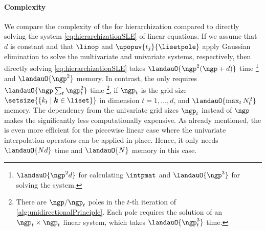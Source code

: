 \paragraph{Complexity}

We compare the complexity of the \up for hierarchization compared
to directly solving the system \eqref{eq:hierarchizationSLE} of
linear equations.
If we assume that $d$ is constant and that
$\linop$ and $\upopuv{t_j}{\lisetpole}$ apply Gaussian elimination to
solve the multivariate and univariate systems, respectively,
then directly solving \eqref{eq:hierarchizationSLE} takes
$\landauO{\ngp^2 (\ngp + d)}$ time%
\footnote{%
  $\landauO{\ngp^2 d}$ for calculating $\intpmat$ and
  $\landauO{\ngp^3}$ for solving the system.
}
and
$\landauO{\ngp^2}$ memory.
In contrast, the \up only requires
$\landauO{\ngp \sum_t \ngp_t^2}$ time%
\footnote{%
  There are $\ngp/\ngp_t$ poles in the
  $t$-th iteration of \cref{alg:unidirectionalPrinciple}.
  Each pole requires the solution of an $\ngp_t \times \ngp_t$ linear system,
  which takes $\landauO{\ngp_t^3}$ time.
},
if $\ngp_t$ is the grid size
$\setsize{\{k_t \mid \*k \in \liset\}}$ in dimension $t = 1, \dotsc, d$,
and $\landauO{\max_t N_t^2}$ memory.
The dependency from the univariate grid sizes $\ngp_t$ instead of $\ngp$
makes the \up significantly less computationally expensive.
As already mentioned,
the \up is even more efficient for the piecewise linear case
where the univariate interpolation operators can be applied
in-place.
Hence, it only needs $\landauO{Nd}$ time and
$\landauO{N}$ memory in this case.
